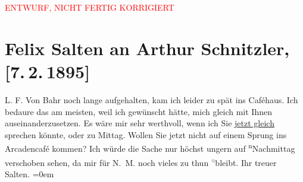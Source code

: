 
\begin{center}
            \textcolor{red}{ENTWURF, NICHT FERTIG KORRIGIERT}
                      \end{center}
            
         
         \renewcommand{\erwaehntePersonen}{Personen: Hermann Bahr}
         \renewcommand{\erwaehnteOrte}{Orte: Café Arkaden, Wien}
         \renewcommand{\erwaehnteWerke}{}
               \section[Felix Salten an Arthur Schnitzler, {[}7. 2. 1895{]}]{ Felix Salten an Arthur Schnitzler, {[}7. 2. 1895{]}}\nopagebreak{}\rehead{ }\begin{ledgroupsized}[t]{13cm}\normalsize\beginnumbering \toendnotes[C]{\smallbreak\pagebreak[2]} 
\pstart
           \noindent{}{\pb}L. F. Von Bahr noch lange
               aufgehalten, kam ich leider zu spät ins Caféhaus. Ich bedaure das am meisten, weil
               ich gewünscht hätte, mich gleich mit Ihnen auseinanderzusetzen. Es wäre mir sehr
               werthvoll, wenn ich Sie \uline{jetzt gleich} sprechen könnte,
               oder zu Mittag. Wollen Sie \introOben{}jetzt\introOben{} nicht auf einem Sprung ins
                  Arcadencafé kommen? \pend
           \pstart
           Ich würde die Sache nur höchst ungern auf \substVorne{}\textsuperscript{n}\substDazwischen{}N\substHinten{}achmittag verschoben sehen, da mir für N. M. noch vieles zu thun \substVorne{}\textsuperscript{\textcolor{gray}{u}}\substDazwischen{}b\substHinten{}leibt. \pend
           \pstart
           Ihr treuer {\\[\baselineskip]}\spacefill\mbox{Salten.}\pend
           \leftskip=0em{}
         
         \endnumbering{}\end{ledgroupsized}\begin{anhang}\end{anhang}\newcommand{\dateiname}{L03150}\newcommand{\titel}{Felix Salten an Arthur Schnitzler, [7. 2. 1895]}\newcommand{\editorInnen}{Martin Anton Müller und Laura Untner}
      